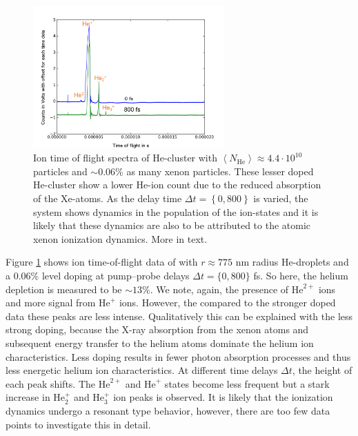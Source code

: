 \begin{figure}
 	\centering
 		\includegraphics[width=0.65\textwidth]{images/results/TOF-helium-xenon-cluster-13.png}
 	\caption{Ion time of flight spectra of He-cluster with $\left\langle N_{\text{He}}\right\rangle\approx 4.4\cdot 10^{10}$ particles and $\sim 0.06\%$ as many xenon particles. These lesser doped He-cluster show a lower He-ion count due to the reduced absorption of the Xe-atoms. As the delay time $\Delta t=\left\{0,800\right\}$ is varied, the system shows dynamics in the population of the ion-states and it is likely  that these dynamics are also to be attributed to the atomic xenon ionization dynamics. More in text.}
 	\label{fig:TOF-helium-xenon-cluster-13}
\end{figure}
Figure \ref{fig:TOF-helium-xenon-cluster-13} shows ion time-of-flight data of with $r\approx 775$ nm radius He-droplets and a $0.06 \%$ level doping at pump--probe delays $\Delta t=\{0, 800\}$ fs. So here, the helium depletion is measured to be $\sim 13\%$. We note, again, the presence of $\text{He}^{2+}$ ions and more signal from $\text{He}^{+}$ ions. However, the compared to the stronger doped data these peaks are less intense. Qualitatively this can be explained with the less strong doping, because the X-ray absorption from the xenon atoms and subsequent energy transfer to the helium atoms dominate the helium ion characteristics. Less doping results in fewer photon absorption processes and thus less energetic helium ion characteristics. At different time delays $\Delta t$, the height of each peak shifts. The $\text{He}^{2+}$ and $\text{He}^{+}$ states become less frequent but a stark increase in $\text{He}_{2}^{+}$ and $\text{He}_{3}^{+}$ ion peaks is observed. It is likely that the ionization dynamics undergo a resonant type behavior, however, there are too few data points to investigate this in detail.\\
